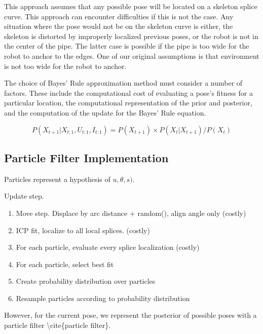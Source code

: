 This approach assumes that any possible pose will be located on a skeleton splice curve. This approach can encounter difficulties if this is not the case. Any situation where the pose would not be on the skeleton curve is either, the skeleton is distorted by improperly localized previous poses, or the robot is not in the center of the pipe. The latter case is possible if the pipe is too wide for the robot to anchor to the edges. One of our original assumptions is that environment is not too wide for the robot to anchor.

The choice of Bayes' Rule approximation method must consider a number of factors. These include the computational cost of evaluating a pose's fitness for a particular location, the computational representation of the prior and posterior, and the computation of the update for the Bayes' Rule equation.


\begin{equation}
P(X_{t+1} | X_{t:1}, U_{t:1}, I_{t:1}) = P(X_{t+1}) \times P(X_t | X_{t+1})  / P(X_t)
\end{equation}


\subsection{Particle Filter Implementation}
\label{particlefilterimplementation}

Particles represent a hypothesis of $u,\theta,s)$. 

Update step.

\begin{enumerate}
\item Move step. Displace by arc distance + random(), align angle only (costly)

\item ICP fit, localize to all local splices. (costly)

\item For each particle, evaluate every splice localization (costly)

\item For each particle, select best fit

\item Create probability distribution over particles

\item Resample particles according to probability distribution

\end{enumerate}

However, for the current pose, we represent the posterior of possible poses with a particle filter \textbackslash{}cite\{particle filter\}.

